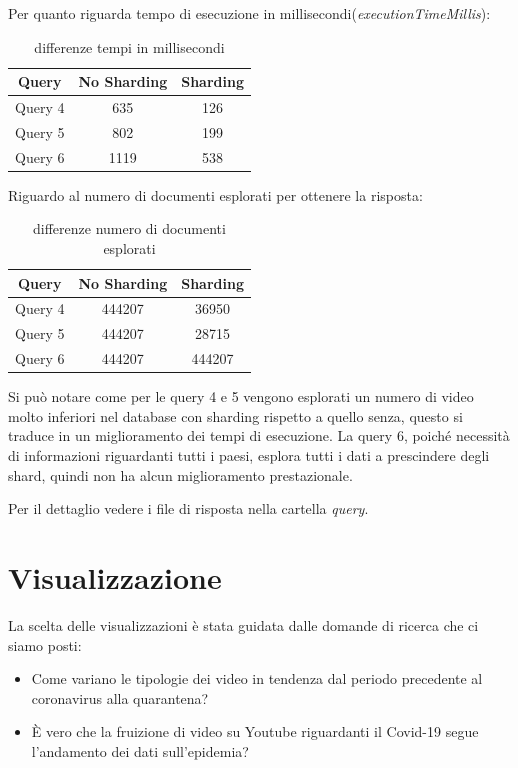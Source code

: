 \documentclass[10pt, a4paper,openany]{article}
\begin{document}
	Per quanto riguarda tempo di esecuzione in millisecondi(\textit{executionTimeMillis}):
	\begin{table}[H]
		\centering
		\begin{tabular}{c|c|c}
			\textbf{Query} & \textbf{No Sharding} & \textbf{Sharding} \\
			\hline
			Query 4 & 635 & 126 \\
			Query 5 & 802 & 199 \\
			Query 6 & 1119 & 538 
		\end{tabular}
		\caption{differenze tempi in millisecondi}
	\end{table}
	
	Riguardo al numero di documenti esplorati per ottenere la risposta:
	\begin{table}[H]
		\centering
		\begin{tabular}{c|c|c}
			\textbf{Query} & \textbf{No Sharding} & \textbf{Sharding} \\
			\hline
			Query 4 & 444207 & 36950 \\
			Query 5 & 444207 & 28715 \\
			Query 6 & 444207 & 444207 
		\end{tabular}
		\caption{differenze numero di documenti esplorati}
	\end{table}
	
	Si può notare come per le query 4 e 5 vengono esplorati un numero di video molto inferiori nel database con sharding rispetto a quello senza, questo si traduce in un miglioramento dei tempi di esecuzione. La query 6, poiché necessità di informazioni riguardanti tutti i paesi, esplora tutti i dati a prescindere degli shard, quindi non ha alcun miglioramento prestazionale.
	
	Per il dettaglio vedere i file di risposta nella cartella \textit{query}.

\section*{Visualizzazione}

La scelta delle visualizzazioni è stata guidata dalle domande di ricerca che ci siamo posti: 
\begin{itemize}
	\item Come variano le tipologie dei video in tendenza dal periodo precedente al coronavirus alla quarantena?
	\item È vero che la fruizione di video su Youtube riguardanti il Covid-19 segue l'andamento dei dati sull'epidemia?
\end{itemize}
\end{document}

